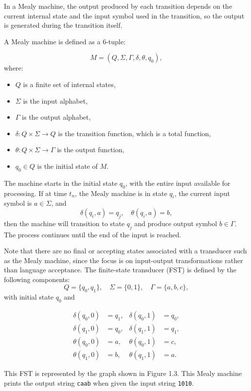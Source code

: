 In a Mealy machine, the output produced by each transition depends on the current internal state and 
the input symbol used in the transition, so the output is generated during the transition itself. 

A Mealy machine is defined as a 6-tuple:

\[
M = (Q, \Sigma, \Gamma, \delta, \theta, q_0),
\]
where:
\begin{itemize}
    \item $Q$ is a finite set of internal states,
    \item $\Sigma$ is the input alphabet,
    \item $\Gamma$ is the output alphabet,
    \item $\delta: Q \times \Sigma \rightarrow Q$ is the transition function, which is a total function,
    \item $\theta: Q \times \Sigma \rightarrow \Gamma$ is the output function,
    \item $q_0 \in Q$ is the initial state of $M$.
\end{itemize}

The machine starts in the initial state $q_0$, with the entire input available for processing. 
If at time $t_n$, the Mealy machine is in state $q_i$, the current input symbol is $a \in \Sigma$, and
\[
\delta(q_i, a) = q_j, \quad \theta(q_i, a) = b,
\]
then the machine will transition to state $q_j$ and produce output symbol $b \in \Gamma$. The process continues until the end of the input is reached.

Note that there are no final or accepting states associated with a transducer such as the Mealy machine, 
since the focus is on input-output transformations rather than language acceptance.
The finite-state transducer (FST) is defined by the following components:
\[
Q = \{q_0, q_1\}, \quad \Sigma = \{0,1\}, \quad \Gamma = \{a, b, c\},
\]
with initial state \( q_0 \) and

\[
\begin{aligned}
\delta(q_0, 0) &= q_1, & \delta(q_0, 1) &= q_0, \\
\delta(q_1, 0) &= q_0, & \delta(q_1, 1) &= q_1, \\
\theta(q_0, 0) &= a, & \theta(q_0, 1) &= c, \\
\theta(q_1, 0) &= b, & \theta(q_1, 1) &= a.
\end{aligned}
\]

This FST is represented by the graph shown in Figure 1.3. 
This Mealy machine prints the output string \texttt{caab} when given the input string \texttt{1010}.

